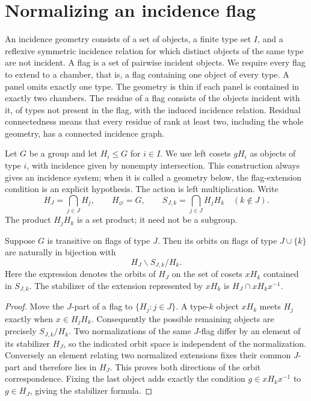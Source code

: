 \section{Normalizing an incidence flag}
\label{sec:fibers}
An incidence geometry consists of a set of objects, a finite type set $I$, and a reflexive symmetric incidence relation for which distinct objects of the same type are not incident. A flag is a set of pairwise incident objects. We require every flag to extend to a chamber, that is, a flag containing one object of every type. A panel omits exactly one type. The geometry is thin if each panel is contained in exactly two chambers. The residue of a flag consists of the objects incident with it, of types not present in the flag, with the induced incidence relation. Residual connectedness means that every residue of rank at least two, including the whole geometry, has a connected incidence graph.

Let $G$ be a group and let $H_i\leq G$ for $i\in I$. We use left cosets $gH_i$ as objects of type $i$, with incidence given by nonempty intersection. This construction always gives an incidence system; when it is called a geometry below, the flag-extension condition is an explicit hypothesis. The action is left multiplication. Write
\[
 H_J=\bigcap_{j\in J}H_j,\qquad H_\varnothing=G,
 \qquad S_{J,k}=\bigcap_{j\in J}H_jH_k\quad(k\notin J).
\]
The product $H_jH_k$ is a set product; it need not be a subgroup.

\begin{theorem}\label{thm:fiber}
Suppose $G$ is transitive on flags of type $J$. Then its orbits on flags of type $J\cup\{k\}$ are naturally in bijection with
\[
                 H_J\backslash S_{J,k}/H_k.
\]
Here the expression denotes the orbits of $H_J$ on the set of cosets $xH_k$ contained in $S_{J,k}$. The stabilizer of the extension represented by $xH_k$ is $H_J\cap xH_kx^{-1}$.
\end{theorem}
\begin{proof}
Move the $J$-part of a flag to $\{H_j:j\in J\}$. A type-$k$ object $xH_k$ meets $H_j$ exactly when $x\in H_jH_k$. Consequently the possible remaining objects are precisely $S_{J,k}/H_k$. Two normalizations of the same $J$-flag differ by an element of its stabilizer $H_J$, so the indicated orbit space is independent of the normalization. Conversely an element relating two normalized extensions fixes their common $J$-part and therefore lies in $H_J$. This proves both directions of the orbit correspondence. Fixing the last object adds exactly the condition $g\in xH_kx^{-1}$ to $g\in H_J$, giving the stabilizer formula.
\end{proof}

